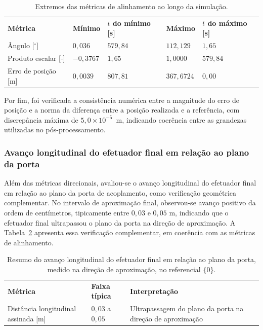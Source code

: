 \begin{table}[H]
\centering
\caption{Extremos das métricas de alinhamento ao longo da simulação.}
\label{tab:cap4_alinhamento_extremos}
\begin{tabularx}{\linewidth}{|
  >{\centering\arraybackslash}X|
  >{\centering\arraybackslash}X|
  >{\centering\arraybackslash}X|
  >{\centering\arraybackslash}X|
  >{\centering\arraybackslash}X|}
\hline
\textbf{Métrica} &
\textbf{Mínimo} &
\textbf{$t$ do mínimo [s]} &
\textbf{Máximo} &
\textbf{$t$ do máximo [s]} \\
\hhline{|=|=|=|=|=|}
Ângulo [${}^\circ$] & $0{,}036$ & $579{,}84$ & $112{,}129$ & $1{,}65$ \\
\hline
Produto escalar [-] & $-0{,}3767$ & $1{,}65$ & $1{,}0000$ & $579{,}84$ \\
\hline
Erro de posição [m] & $0{,}0039$ & $807{,}81$ & $367{,}6724$ & $0{,}00$ \\
\hline
\end{tabularx}
\end{table}


Por fim, foi verificada a consistência numérica entre a magnitude do erro de posição e a norma da diferença entre a posição realizada e a referência, com discrepância máxima de $5{,}0\times 10^{-5}$~m, indicando coerência entre as grandezas utilizadas no pós-processamento.

\subsubsection{Avanço longitudinal do efetuador final em relação ao plano da porta}
\label{subsubsec:cap4_alinhamento_avanco_normal}

Além das métricas direcionais, avaliou-se o avanço longitudinal do efetuador final em relação ao plano da porta de acoplamento, como verificação geométrica complementar.
No intervalo de aproximação final, observou-se avanço positivo da ordem de centímetros, tipicamente entre $0{,}03$ e $0{,}05$ m, indicando que o efetuador final ultrapassou o plano da porta na direção de aproximação. A Tabela~\ref{tab:cap4_alinhamento_avanco_normal} apresenta essa verificação complementar, em coerência com as métricas de alinhamento.

\begin{table}[H]
\centering
\caption{Resumo do avanço longitudinal do efetuador final em relação ao plano da porta, medido na direção de aproximação, no referencial $\{0\}$.}
\label{tab:cap4_alinhamento_avanco_normal}
\begin{tabularx}{\linewidth}{|
  >{\centering\arraybackslash}X|
  >{\centering\arraybackslash}X|
  >{\centering\arraybackslash}X|}
\hline
\textbf{Métrica} & \textbf{Faixa típica} & \textbf{Interpretação} \\
\hhline{|=|=|=|}
Distância longitudinal assinada [m] & $0{,}03$ a $0{,}05$ & Ultrapassagem do plano da porta na direção de aproximação \\
\hline
\end{tabularx}
\end{table}


